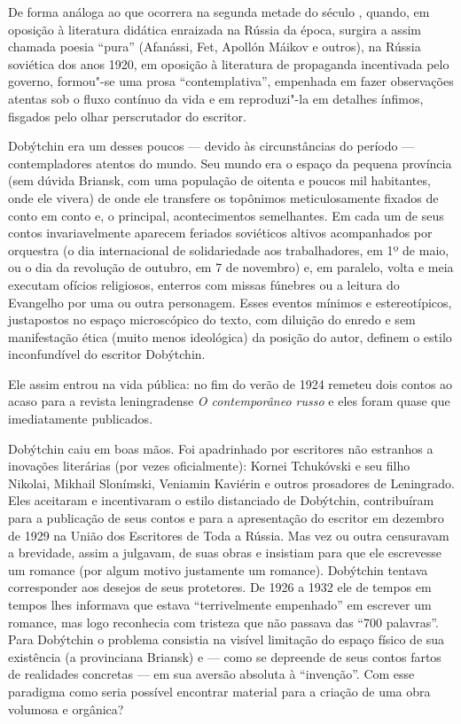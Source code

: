 De forma análoga ao que ocorrera na segunda metade do século \scalebox{.8}{XIX},
quando, em oposição à literatura didática enraizada na Rússia da época,
surgira a assim chamada poesia ``pura'' (Afanássi, Fet, Apollón Máikov e
outros), na Rússia soviética dos anos 1920, em oposição à literatura de
propaganda incentivada pelo governo, formou"-se uma prosa
``contemplativa'', empenhada em fazer observações atentas sob o fluxo
contínuo da vida e em reproduzi"-la em detalhes ínfimos, fisgados pelo
olhar perscrutador do escritor.

Dobýtchin era um desses poucos --- devido às circunstâncias do período
--- contempladores atentos do mundo. Seu mundo era o espaço da pequena
província (sem dúvida Briansk, com uma população de oitenta e poucos mil
habitantes, onde ele vivera) de onde ele transfere os topônimos
meticulosamente fixados de conto em conto e, o principal, acontecimentos
semelhantes. Em cada um de seus contos invariavelmente aparecem feriados
soviéticos altivos acompanhados por orquestra (o dia internacional de %
solidariedade aos trabalhadores, em 1º de maio, ou o dia da revolução de
outubro, em 7 de novembro) e, em paralelo, volta e meia executam ofícios
religiosos, enterros com missas fúnebres ou a leitura do Evangelho por
uma ou outra personagem. Esses eventos mínimos e estereotípicos,
justapostos no espaço microscópico do texto, com diluição do enredo e
sem manifestação ética (muito menos ideológica) da posição do autor,
definem o estilo inconfundível do escritor Dobýtchin.

Ele assim entrou na vida pública: no fim do verão de 1924 remeteu dois
contos ao acaso para a revista leningradense \emph{O contemporâneo
russo} e eles foram quase que imediatamente publicados.

Dobýtchin caiu em boas mãos. Foi apadrinhado por escritores não
estranhos a inovações literárias (por vezes oficialmente): Kornei
Tchukóvski e seu filho Nikolai, Mikhail Slonímski, Veniamin Kaviérin e
outros prosadores de Leningrado. Eles aceitaram e incentivaram o estilo
distanciado de Dobýtchin, contribuíram para a publicação de seus contos
e para a apresentação do escritor em dezembro de 1929 na União dos
Escritores de Toda a Rússia. Mas vez ou outra censuravam a brevidade,
assim a julgavam, de suas obras e insistiam para que ele escrevesse um
romance (por algum motivo justamente um romance). Dobýtchin tentava
corresponder aos desejos de seus protetores. De 1926 a 1932 ele de
tempos em tempos lhes informava que estava ``terrivelmente empenhado''
em escrever um romance, mas logo reconhecia com tristeza que não passava
das ``700 palavras''. Para Dobýtchin o problema consistia na visível
limitação do espaço físico de sua existência (a provinciana Briansk) e
--- como se depreende de seus contos fartos de realidades concretas ---
em sua aversão absoluta à ``invenção''. Com esse paradigma como seria
possível encontrar material para a criação de uma obra volumosa e
orgânica?

